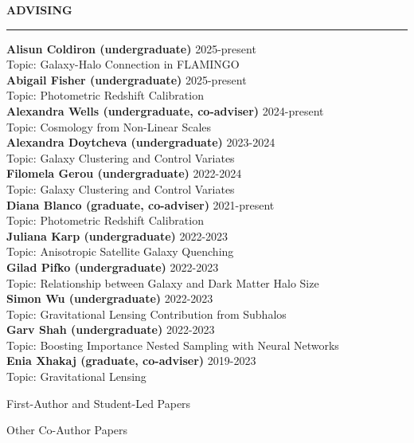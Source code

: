 \documentclass[12pt]{article}
\renewenvironment{section}[1]
  {
  \medskip
  {\color{aublue} \MakeUppercase{\bf #1}}
  \smallskip
  \hrule
  \medskip
  \begin{adjustwidth}{0.3cm}{}
  }
  {
  \end{adjustwidth}
  }
\newenvironment{ref-section}[1]
  {
  \medskip
  {\color{aublue} \MakeUppercase{\bf #1}}
  \smallskip
  \hrule
  \medskip
  \begin{refsection}
  }
  {
  \end{refsection}
  }
\newcommand{\entry}[3]{{\bf #1} \hfill {#2} \\ {#3}}
\begin{document}
\begin{section}{Advising}
  \entry{Alisun Coldiron (undergraduate)}{2025-present}{Topic: Galaxy-Halo Connection in FLAMINGO} \medskip \\
  \entry{Abigail Fisher (undergraduate)}{2025-present}{Topic: Photometric Redshift Calibration} \medskip \\
  \entry{Alexandra Wells (undergraduate, co-adviser)}{2024-present}{Topic: Cosmology from Non-Linear Scales} \medskip \\
  \entry{Alexandra Doytcheva (undergraduate)}{2023-2024}{Topic: Galaxy Clustering and Control Variates} \medskip \\
  \entry{Filomela Gerou (undergraduate)}{2022-2024}{Topic: Galaxy Clustering and Control Variates} \medskip \\
  \entry{Diana Blanco (graduate, co-adviser)}{2021-present}{Topic: Photometric Redshift Calibration} \medskip \\
  \entry{Juliana Karp (undergraduate)}{2022-2023}{Topic: Anisotropic Satellite Galaxy Quenching} \medskip \\
  \entry{Gilad Pifko (undergraduate)}{2022-2023}{Topic: Relationship between Galaxy and Dark Matter Halo Size} \medskip \\
  \entry{Simon Wu (undergraduate)}{2022-2023}{Topic: Gravitational Lensing Contribution from Subhalos} \medskip \\
  \entry{Garv Shah (undergraduate)}{2022-2023}{Topic: Boosting Importance Nested Sampling with Neural Networks} \medskip \\
  \entry{Enia Xhakaj (graduate, co-adviser)}{2019-2023}{Topic: Gravitational Lensing} \medskip \\
\end{section}

\begin{ref-section}{First-Author and Student-Led Papers}
  \nocite{Doytcheva2024_ApJ_977_184, Lange2024_OJAp_7_57, Lange2023_MNRAS_525_3181, Karp2023_ApJ_949_13, Lange2023_MNRAS_520_5373, Lange2022_MNRAS_509_1779, Lange2021_MNRAS_502_2074, Lange2019_MNRAS_490_1870, Lange2019_MNRAS_488_5771, Lange2019_MNRAS_487_3112, Lange2019_MNRAS_482_4824, Lange2018_MNRAS_473_2830, Lange2016_ApJ_819_4, Lange2015_MNRAS_447_939, Lange2013_AA_551_89}
  \printbibliography[heading=none]
\end{ref-section}

\begin{ref-section}{Other Co-Author Papers}
  \nocite{Blake2025_OJAp_8_24, Chen2024_PhRvD_110_3518, Kwiecien2024_arXiv_2410_0205, Mitra2024_MNRAS_533_3647, Yuan2024_MNRAS_533_589, Wang2024_ApJ_971_119, DESICollaboration2024_AJ_168_58, Xhakaj2024_MNRAS_530_4203, DESICollaboration2024_AJ_167_62, Hadzhiyska2023_MNRAS_525_4367, Ruggeri2023_MNRAS_525_3865, Wang2022_MNRAS_516_4003, DESICollaboration2022_AJ_164_207, Huang2022_MNRAS_515_4722, Xhakaj2022_MNRAS_514_2876, Dawson2022_arXiv_2203_7291, Leauthaud2022_MNRAS_510_6150, Wang2020_MNRAS_498_4450, vandenBosch2019_MNRAS_488_4984, Wang2019_MNRAS_488_3541, Zentner2019_MNRAS_485_1196, Campbell2018_MNRAS_477_359, Villarreal2017_MNRAS_472_1088, Nelson2016_ApJ_828_27, Momcheva2016_ApJS_225_27}
  \printbibliography[heading=none]
\end{ref-section}
\end{document}
